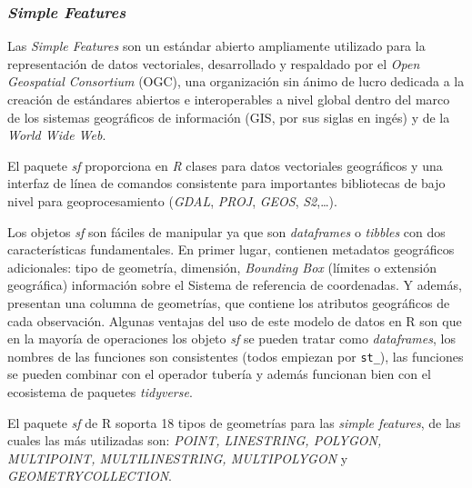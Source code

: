 \documentclass[12pt,a4paper,]{book}
\numberwithin{dummy}{section}
\theoremstyle{ocrenumbox}
\theoremstyle{blacknumex}
\theoremstyle{blacknumbox}
\theoremstyle{ocrenum}
\theoremstyle{ocrenum}
\begin{document}
\hypertarget{simple-features}{%
\subsubsection*{\texorpdfstring{\emph{Simple
Features}}{Simple Features}}\label{simple-features}}

Las \emph{Simple Features} son un estándar abierto ampliamente utilizado
para la representación de datos vectoriales, desarrollado y respaldado
por el \emph{Open Geospatial Consortium} (OGC), una organización sin
ánimo de lucro dedicada a la creación de estándares abiertos e
interoperables a nivel global dentro del marco de los sistemas
geográficos de información (GIS, por sus siglas en ingés) y de la
\emph{World Wide Web}. \citep{OCGweb}

El paquete \emph{sf} proporciona en \emph{R} clases para datos
vectoriales geográficos y una interfaz de línea de comandos consistente
para importantes bibliotecas de bajo nivel para geoprocesamiento
(\emph{GDAL}, \emph{PROJ}, \emph{GEOS}, \emph{S2},\ldots).
\citep{sfpackage}

Los objetos \emph{sf} son fáciles de manipular ya que son
\emph{dataframes} o \emph{tibbles} con dos características
fundamentales. En primer lugar, contienen metadatos geográficos
adicionales: tipo de geometría, dimensión, \emph{Bounding Box} (límites
o extensión geográfica) información sobre el Sistema de referencia de
coordenadas. Y además, presentan una columna de geometrías, que contiene
los atributos geográficos de cada observación. Algunas ventajas del uso
de este modelo de datos en R son que en la mayoría de operaciones los
objeto \emph{sf} se pueden tratar como \emph{dataframes}, los nombres de
las funciones son consistentes (todos empiezan por \texttt{st\_}), las
funciones se pueden combinar con el operador tubería y además funcionan
bien con el ecosistema de paquetes \emph{tidyverse}.

El paquete \emph{sf} de R soporta 18 tipos de geometrías para las
\emph{simple features}, de las cuales las más utilizadas son:
\emph{POINT, LINESTRING, POLYGON, MULTIPOINT, MULTILINESTRING,
MULTIPOLYGON} y \emph{GEOMETRYCOLLECTION}.
\end{document}
